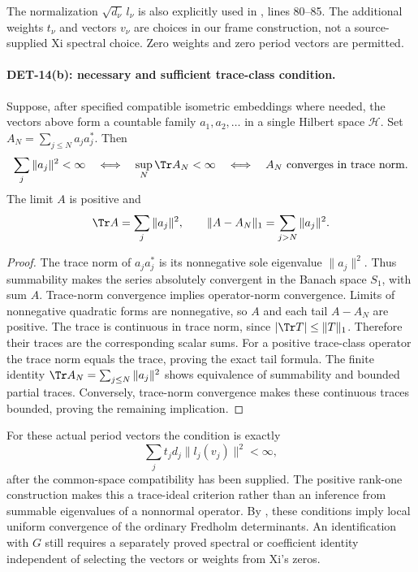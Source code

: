 The normalization \(\sqrt{d_\nu}\,l_\nu\) is also explicitly used in
,
lines 80--85. The additional weights \(t_\nu\) and vectors \(v_\nu\)
are choices in our frame construction, not a source-supplied Xi
spectral choice. Zero weights and zero period vectors are permitted.

\paragraph{DET-14(b): necessary and sufficient trace-class condition.}
Suppose, after specified compatible isometric embeddings where needed,
the vectors above form a countable family \(a_1,a_2,\ldots\) in a
single Hilbert space \(\mathcal H\). Set
\(A_N=\sum_{j\le N}a_ja_j^*\). Then
\[
 \sum_j\|a_j\|^2<\infty
 \quad\Longleftrightarrow\quad
 \sup_N\Tr A_N<\infty
 \quad\Longleftrightarrow\quad
 A_N\ \hbox{converges in trace norm}.
\]
The limit \(A\) is positive and
\[
 \Tr A=\sum_j\|a_j\|^2,\qquad
 \|A-A_N\|_1=\sum_{j>N}\|a_j\|^2.
\]
\begin{proof}
The trace norm of \(a_ja_j^*\) is its nonnegative sole eigenvalue
\(\|a_j\|^2\). Thus summability makes the series absolutely
convergent in the Banach space \(S_1\), with sum \(A\).
Trace-norm convergence implies operator-norm convergence.
Limits of nonnegative quadratic forms are nonnegative, so \(A\)
and each tail \(A-A_N\) are positive.
The trace is continuous in trace norm, since
\(|\Tr T|\le\|T\|_1\). Therefore their traces are the corresponding
scalar sums. For a positive trace-class operator the trace norm
equals the trace, proving the exact tail formula.
The finite identity \(\Tr A_N=\sum_{j\le N}\|a_j\|^2\)
shows equivalence of summability and bounded partial traces.
Conversely, trace-norm convergence makes these continuous traces
bounded, proving the remaining implication.
\end{proof}
For these actual period vectors the condition is exactly
\[
 \sum_j t_jd_j\|l_j(v_j)\|^2<\infty,
\]
after the common-space compatibility has been supplied.
The positive rank-one construction makes this a trace-ideal
criterion rather than an inference from summable eigenvalues of a
nonnormal operator. By , these conditions imply local
uniform convergence of the ordinary Fredholm determinants.
An identification with \(G\) still requires a separately proved
spectral or coefficient identity independent of selecting the
vectors or weights from Xi's zeros.

